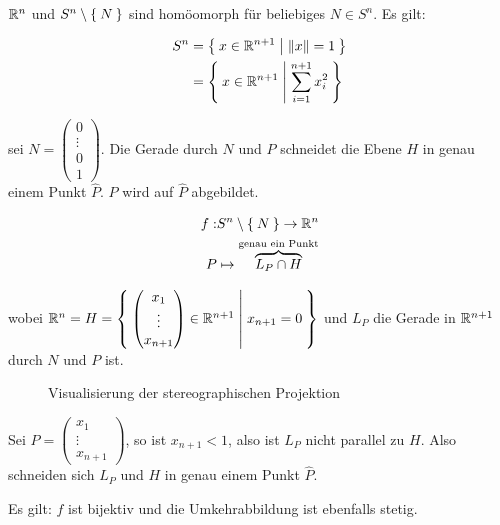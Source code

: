 \begin{beispiel}%
    $\mathbb{R}^n$ und $S^n \setminus \Set{N}$ sind homöomorph für
    beliebiges $N \in S^n$. Es gilt:

    \begin{align*}
        S^n &= \Set{x \in \ensuremath{\mathbb{R}}^{n+1} | \|x\| = 1}\\
            &= \Set{x \in \ensuremath{\mathbb{R}}^{n+1} | \sum_{i=1}^{n+1} x_i^2}
    \end{align*}
    
    \Obda sei $N = \begin{pmatrix}0\\ \vdots\\ 0\\1\end{pmatrix}$. Die
    Gerade durch $N$ und $P$ schneidet die Ebene $H$ in genau einem
    Punkt $\hat{P}$. $P$ wird auf $\hat{P}$ abgebildet.

    \begin{align*}
        f: &S^n \setminus \Set{N} \rightarrow \mathbb{R}^n\\
        P  &\mapsto \overbrace{L_P \cap H}^\text{genau ein Punkt}
    \end{align*}

    wobei $\mathbb{R}^n = H = \Set{\begin{pmatrix}x_1\\ \vdots \\ x_{n+1}\end{pmatrix} \in \ensuremath{\mathbb{R}}^{n+1} | x_{n+1} = 0}$
    und $L_P$ die Gerade in $\mathbb{R}^{n+1}$ durch $N$ und $P$ ist.

    \begin{figure}[htp]
        \centering
        \resizebox{0.9\linewidth}{!}{}
        \caption{Visualisierung der stereographischen Projektion}
        \label{fig:stereographic-projection}
    \end{figure}

    Sei $P = \begin{pmatrix}x_1\\ \vdots \\ x_{n+1}\end{pmatrix}$, so
    ist $x_{n+1} < 1$, also ist $L_P$ nicht parallel zu $H$. Also
    schneiden sich $L_P$ und $H$ in genau einem Punkt $\hat{P}$.

    Es gilt: $f$ ist bijektiv und die Umkehrabbildung ist ebenfalls
    stetig.    
\end{beispiel}
